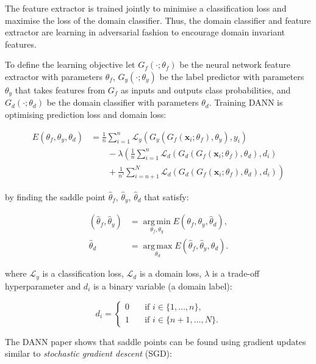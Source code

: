 The feature extractor is trained jointly to minimise a classification loss
and maximise the loss of the domain classifier.
Thus, the domain classifier and feature extractor are learning in adversarial fashion to encourage domain invariant features.

To define the learning objective let
\(G_f(\cdot; \theta_f)\) be the neural network feature extractor with parameters \(\theta_f\),
\(G_y(\cdot; \theta_y)\) be the label predictor with parameters \(\theta_y\)
that takes features from \(G_f\) as inputs and outputs class probabilities,
and~\(G_d(\cdot; \theta_d)\) be the domain classifier with parameters \(\theta_d\). 
Training DANN is optimising prediction loss and domain loss:

\begin{align}
	E(\theta_f, \theta_y, \theta_d) &= \frac{1}{n} \sum^{n}_{i = 1} \mathcal{L}_y(G_y(G_f(\mathbf{x}_i; \theta_f), \theta_y), y_i) \nonumber \\
	&\qquad {} - \lambda \left(\frac{1}{n} \sum^{n}_{i = 1} \mathcal{L}_d(G_d(G_f(\mathbf{x}_i; \theta_f), \theta_d), d_i) \right. \nonumber \\
	&\qquad \left. {} + \frac{1}{n'} \sum^{N}_{i = n + 1} \mathcal{L}_d(G_d(G_f(\mathbf{x}_i; \theta_f), \theta_d), d_i)\right)
\end{align}

by finding the saddle point \(\hat{\theta}_f\), \(\hat{\theta}_y\), \(\hat{\theta}_d\) that satisfy:

\begin{align}
	(\hat{\theta}_f, \hat{\theta}_y)
	&= \operatorname*{arg\,min}_{\theta_f, \theta_y} E(\theta_f, \theta_y, \hat{\theta}_d),\\
	\hat{\theta}_d
	&= \operatorname*{arg\,max}_{\theta_d} E(\hat{\theta}_f, \hat{\theta}_y, \theta_d).
\end{align}

where \(\mathcal{L}_y\) is a classification loss,
\(\mathcal{L}_d\) is a domain loss,
\(\lambda\) is a trade-off hyperparameter
and \(d_i\) is a binary variable (a domain label):

\begin{equation}
	d_i =
	\begin{cases}
		0 & \quad \text{if } i \in \{1, \dots, n\}, \\
		1 & \quad \text{if } i \in \{n + 1, \dots, N\}.
	\end{cases}
\end{equation}

The DANN paper shows that saddle points can be found using gradient updates
similar to \textit{stochastic gradient descent} (SGD):

